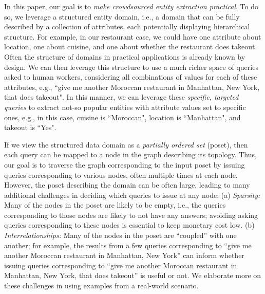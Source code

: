 In this paper, our goal is to {\em make crowdsourced entity extraction practical}. To do so, we leverage a structured entity domain, i.e., a domain that can be fully described by a collection of attributes, each potentially displaying hierarchical structure. For example, in our restaurant case, we could have one attribute about location, one about cuisine, and one about whether the restaurant does takeout. Often the structure of domains in practical applications is already known by design. We can then leverage this structure to use a much richer space of queries asked to human workers, considering all combinations of values for each of these attributes, e.g., ``give me another Moroccan restaurant in Manhattan, New York, that does takeout".  In this manner, we can leverage these {\em specific, targeted queries} to extract not-so popular entities with attribute values set to specific ones, e.g., in this case, cuisine is ``Moroccan", location is ``Manhattan", and takeout is ``Yes".

If we view the structured data domain as a \emph{partially ordered set} (poset), then each query can be mapped to a node in the graph describing its topology. Thus, our goal is to traverse the graph corresponding to the input poset by issuing queries corresponding to various nodes, often multiple times at each node. However, the poset describing the domain can be often large, leading to many additional challenges in deciding which queries to issue at any node: (a) {\em Sparsity:} Many of the nodes in the poset are likely to be empty, i.e., the queries corresponding to those nodes are likely to not have any answers; avoiding asking queries corresponding to these nodes is essential to keep monetary cost low. (b) {\em Interrelationships:} Many of the nodes in the poset are ``coupled'' with one another; for example, the results from a few queries corresponding to ``give me another Moroccan restaurant in Manhattan, New York'' can inform whether issuing queries corresponding to ``give me another Moroccan restaurant in Manhattan, New York, that does takeout'' is useful or not. We elaborate more on these challenges in  using examples from a real-world scenario.

